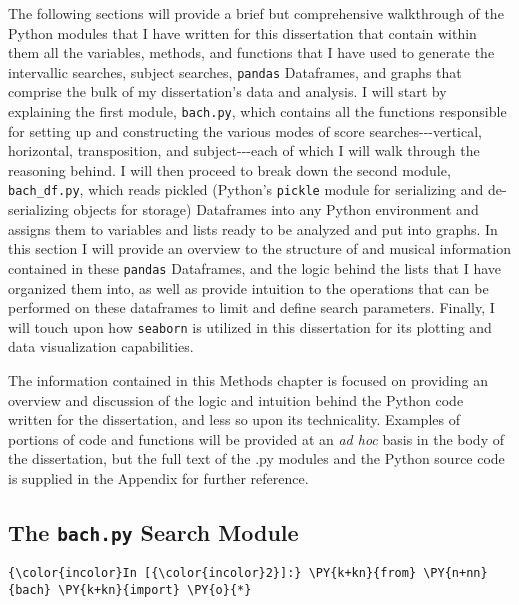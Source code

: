 The following sections will provide a brief but comprehensive
walkthrough of the Python modules that I have written for this
dissertation that contain within them all the variables, methods, and
functions that I have used to generate the intervallic searches, subject
searches, \texttt{pandas} Dataframes, and graphs that comprise the bulk
of my dissertation's data and analysis. I will start by explaining the
first module, \texttt{bach.py}, which contains all the functions
responsible for setting up and constructing the various modes of score
searches-\/-\/-vertical, horizontal, transposition, and
subject-\/-\/-each of which I will walk through the reasoning behind. I
will then proceed to break down the second module, \texttt{bach\_df.py},
which reads pickled (Python's \texttt{pickle} module for serializing and
de-serializing objects for storage) Dataframes into any Python
environment and assigns them to variables and lists ready to be analyzed
and put into graphs. In this section I will provide an overview to the
structure of and musical information contained in these \texttt{pandas}
Dataframes, and the logic behind the lists that I have organized them
into, as well as provide intuition to the operations that can be
performed on these dataframes to limit and define search parameters.
Finally, I will touch upon how \texttt{seaborn} is utilized in this
dissertation for its plotting and data visualization capabilities.

The information contained in this Methods chapter is focused on
providing an overview and discussion of the logic and intuition behind
the Python code written for the dissertation, and less so upon its
technicality. Examples of portions of code and functions will be
provided at an \emph{ad hoc} basis in the body of the dissertation, but
the full text of the .py modules and the Python source code is supplied
in the Appendix for further reference.

    \subsection{\texorpdfstring{The \texttt{bach.py} Search
Module}{The bach.py Search Module}}\label{the-bach.py-search-module}

    \begin{Verbatim}[commandchars=\\\{\}]
{\color{incolor}In [{\color{incolor}2}]:} \PY{k+kn}{from} \PY{n+nn}{bach} \PY{k+kn}{import} \PY{o}{*}
\end{Verbatim}

